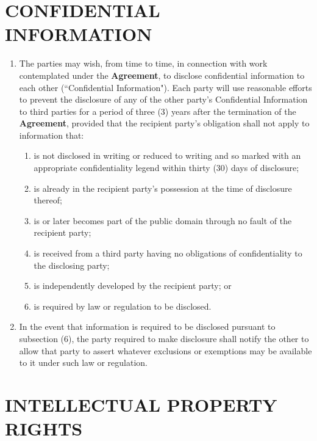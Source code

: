 \documentclass[11pt]{article}
\begin{document}
\section{CONFIDENTIAL INFORMATION }    
\begin{enumerate}  \itemsep4pt \parskip0pt 
\item The parties may wish, from time to time, in connection with work       contemplated under  the \textbf{Agreement}, to disclose confidential       information to each other (``Confidential Information"). Each party       will use reasonable efforts to prevent the disclosure of any of       the other party's Confidential Information to third parties for a       period of three (3) years after the termination of  the \textbf{Agreement},       provided that the recipient party's obligation shall not apply to       information that:               
\begin{enumerate}  \itemsep4pt \parskip0pt 
\item  is not disclosed in writing or reduced to writing and so                 marked with an appropriate confidentiality legend within                 thirty (30) days of disclosure;              
\item is already in the recipient party's possession at the                 time of disclosure thereof;              
\item  is or later becomes part of the public domain through no                 fault of the recipient party;              
\item  is received from a third party having no obligations of                 confidentiality to the disclosing party;              
\item is independently developed by the recipient party; or              
\item is required by law or regulation to be disclosed.     
\end{enumerate}
\item In the event that information is required to be disclosed pursuant       to subsection (6), the party required to make disclosure shall       notify the other to allow that party to assert whatever exclusions       or exemptions may be available to it under such law or regulation.  
\end{enumerate}


\section{INTELLECTUAL PROPERTY RIGHTS } 
\end{document}
